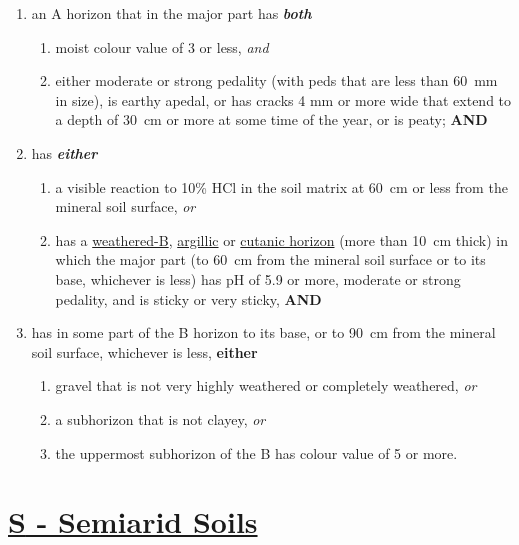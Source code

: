\documentclass[
  letterpaper,
  DIV=11,
  numbers=noendperiod]{scrreprt}
\providecommand{\tightlist}{%
  \setlength{\itemsep}{0pt}\setlength{\parskip}{0pt}}\usepackage{longtable,booktabs,array}
\begin{document}
\begin{enumerate}
\def\labelenumi{\arabic{enumi}.}
\tightlist
\item
  an A horizon that in the major part has \textbf{\emph{both}}

  \begin{enumerate}
  \def\labelenumii{(\alph{enumii})}
  \tightlist
  \item
    moist colour value of 3 or less, \emph{and}
  \item
    either moderate or strong pedality (with peds that are less than
    60~mm in size), is earthy apedal, or has cracks 4 mm or more wide
    that extend to a depth of 30~cm or more at some time of the year, or
    is peaty; \textbf{AND}
  \end{enumerate}
\item
  has \textbf{\emph{either}}

  \begin{enumerate}
  \def\labelenumii{(\alph{enumii})}
  \tightlist
  \item
    a visible reaction to 10\% HCl in the soil matrix at 60~cm or less
    from the mineral soil surface, \emph{or}
  \item
    has a \protect\hyperlink{sec-diag-bw}{weathered-B},
    \protect\hyperlink{sec-diag-argh}{argillic} or
    \protect\hyperlink{sec-diag-cuth}{cutanic horizon} (more than 10~cm
    thick) in which the major part (to 60~cm from the mineral soil
    surface or to its base, whichever is less) has pH of 5.9 or more,
    moderate or strong pedality, and is sticky or very sticky,
    \textbf{AND}
  \end{enumerate}
\item
  has in some part of the B horizon to its base, or to 90~cm from the
  mineral soil surface, whichever is less, \textbf{either}

  \begin{enumerate}
  \def\labelenumii{(\alph{enumii})}
  \tightlist
  \item
    gravel that is not very highly weathered or completely weathered,
    \emph{or}
  \item
    a subhorizon that is not clayey, \emph{or}
  \item
    the uppermost subhorizon of the B has colour value of 5 or more.
  \end{enumerate}
\end{enumerate}

\hypertarget{sec-S}{%
\section{\texorpdfstring{\protect\hyperlink{sec-ord-S}{\textbf{S} -
Semiarid Soils}}{S - Semiarid Soils}}\label{sec-S}}
\end{document}

